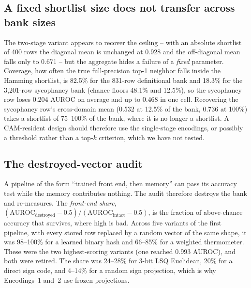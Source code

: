 \documentclass[conference]{IEEEtran}
\newcommand{\cam}{{CAM}\xspace}
\newcommand{\auroc}{{AUROC}\xspace}
\begin{document}
\subsection{A fixed shortlist size does not transfer across bank sizes}
\label{subsec:Shortlist}
The two-stage variant appears to recover the ceiling -- with an
absolute shortlist of 400 rows the diagonal mean is unchanged at
0.928 and the off-diagonal mean falls only to 0.671 -- but the
aggregate hides a failure of a \emph{fixed} parameter. Coverage, how
often the true full-precision top-1 neighbor falls inside the
Hamming shortlist, is 82.5\% for the 831-row definitional bank and
18.3\% for the 3{,}201-row sycophancy bank (chance floors 48.1\% and
12.5\%), so the sycophancy row loses 0.204 \auroc on average and up
to 0.468 in one cell. Recovering the sycophancy row's cross-domain
mean (0.532 at 12.5\% of the bank, 0.736 at 100\%) takes a shortlist
of 75--100\% of the bank, where it is no longer a shortlist. A
\cam-resident design should therefore use the single-stage
encodings, or possibly a threshold rather than a top-$k$ criterion,
which we have not tested.

\subsection{The destroyed-vector audit}
\label{subsec:Audit}
\label{subsec:AuditResults}
A pipeline of the form ``trained front end, then memory'' can pass
its accuracy test while the memory contributes nothing. The audit
therefore destroys the bank and re-measures. The \emph{front-end
share},
$(\mathrm{AUROC}_{\mathrm{destroyed}}-0.5)/(\mathrm{AUROC}_{\mathrm{intact}}-0.5)$,
is the fraction of above-chance accuracy that survives, where high is
bad. Across five variants of the first pipeline, with every stored
row replaced by a random vector of the same shape, it was 98--100\%
for a learned binary hash and 66--85\% for a weighted thermometer.
These were the two highest-scoring variants (one reached 0.993
\auroc), and both were retired. The share was 24--28\% for 3-bit LSQ
Euclidean, 20\% for a direct sign code, and 4--14\% for a random sign
projection, which is why Encodings~1 and~2 use frozen projections.
\end{document}
